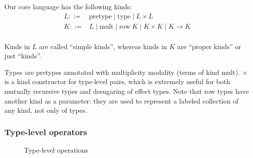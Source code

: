 \documentclass[conference]{IEEEtran}
\begin{document}
Our core language has the following kinds:
\[
    \begin{array}{rl}
        L ::=& \text{pretype} \;|\; \text{type} \;|\; L \times L \\
        K ::=& L \;|\; \text{mult} \;|\; \text{row} \; K \;|\; K \times K
            \;|\; K \to K \\
    \end{array}
\]

Kinds in $L$ are called ``simple kinds'', whereas kinds in $K$ are ``proper
kinds'' or just ``kinds''.

Types are pretypes annotated with multiplicity modality (terms of kind mult).
$\times$ is a kind constructor for type-level pairs, which is extremely useful
for both mutually recursive types and desugaring of effect types. Note that
row types have another kind as a parameter: they are used to represent a labeled
collection of any kind, not only of types.

\subsubsection{Type-level operators}

\begin{figure}
    \centering
    \caption{Type-level operations}
    \label{typelevel}
\end{figure}
\end{document}
